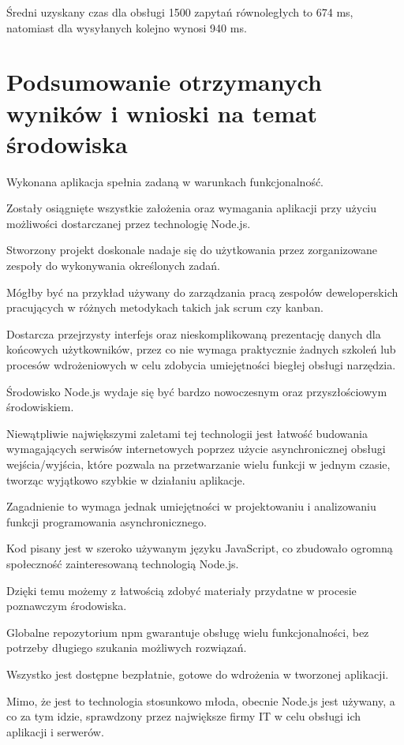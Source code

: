 \documentclass[12pt]{report}
\begin{document}
Średni uzyskany czas dla obsługi 1500 zapytań równoległych to 674 ms, natomiast dla wysyłanych kolejno wynosi 940 ms.


\chapter{Podsumowanie otrzymanych wyników i wnioski na temat środowiska}
Wykonana aplikacja spełnia zadaną w warunkach funkcjonalność.

Zostały osiągnięte wszystkie założenia oraz wymagania aplikacji przy użyciu możliwości dostarczanej przez technologię Node.js.

Stworzony projekt doskonale nadaje się do użytkowania przez zorganizowane zespoły do wykonywania określonych zadań.

Mógłby być na przykład używany do zarządzania pracą zespołów deweloperskich pracujących w różnych metodykach takich jak scrum czy kanban.

Dostarcza przejrzysty interfejs oraz nieskomplikowaną prezentację danych dla końcowych użytkowników, przez co nie wymaga praktycznie żadnych szkoleń lub procesów wdrożeniowych w celu zdobycia umiejętności biegłej obsługi narzędzia.

Środowisko Node.js wydaje się być bardzo nowoczesnym oraz przyszłościowym środowiskiem.

Niewątpliwie największymi zaletami tej technologii jest łatwość budowania wymagających serwisów internetowych poprzez użycie asynchronicznej obsługi wejścia/wyjścia, które pozwala na przetwarzanie wielu funkcji w jednym czasie, tworząc wyjątkowo szybkie w działaniu aplikacje.

Zagadnienie to wymaga jednak umiejętności w projektowaniu i analizowaniu funkcji programowania asynchronicznego.

Kod pisany jest w szeroko używanym języku JavaScript, co zbudowało ogromną społeczność zainteresowaną technologią Node.js.

Dzięki temu możemy z łatwością zdobyć materiały przydatne w procesie poznawczym środowiska.

Globalne repozytorium npm gwarantuje obsługę wielu funkcjonalności, bez potrzeby długiego szukania możliwych rozwiązań.

Wszystko jest dostępne bezpłatnie, gotowe do wdrożenia w tworzonej aplikacji.

Mimo, że jest to technologia stosunkowo młoda, obecnie Node.js jest używany, a co za tym idzie, sprawdzony przez największe firmy IT w celu obsługi ich aplikacji i serwerów.
\end{document}
